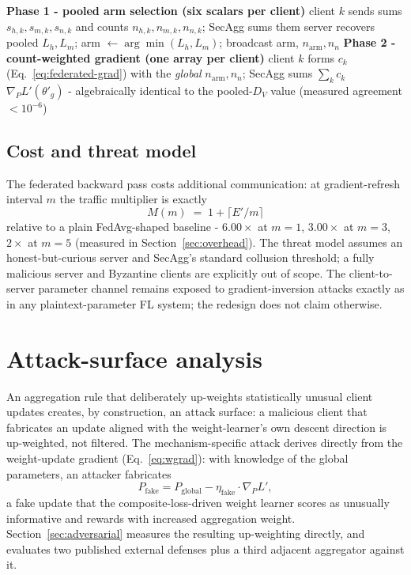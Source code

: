 \documentclass[11pt,a4paper]{report}
\newcommand{\Lprime}{L'}
\begin{document}
\begin{algorithm}[htbp]
\caption{FedGRAA-v2 federated backward pass (two-phase, count-weighted)}
\label{alg:fedgraa-v2}
\begin{algorithmic}[1]
\Statex \textbf{Phase 1 - pooled arm selection (six scalars per client)}
\State client $k$ sends sums $s_{h,k},s_{m,k},s_{n,k}$ and counts
  $n_{h,k},n_{m,k},n_{n,k}$; SecAgg sums them
\State server recovers pooled $L_h,L_m$; arm $\gets\arg\min(L_h,L_m)$;
  broadcast arm, $n_{\mathrm{arm}}, n_n$
\Statex \textbf{Phase 2 - count-weighted gradient (one array per client)}
\State client $k$ forms $c_k$ (Eq.~\eqref{eq:federated-grad}) with the
  \emph{global} $n_{\mathrm{arm}}, n_n$; SecAgg sums $\sum_k c_k$
\State \Return $\nabla_P\Lprime(\theta'_g)$ - algebraically identical to
  the pooled-$D_V$ value (measured agreement $<10^{-6}$)
\end{algorithmic}
\end{algorithm}

\subsection{Cost and threat model}
The federated backward pass costs additional communication: at
gradient-refresh interval $m$ the traffic multiplier is exactly
\begin{equation}
M(m) \;=\; 1+\lceil E'/m \rceil
\label{eq:overhead}
\end{equation}
relative to a plain FedAvg-shaped baseline - $6.00\times$ at $m=1$,
$3.00\times$ at $m=3$, $2\times$ at $m=5$ (measured in
Section~\ref{sec:overhead}). The threat model assumes an honest-but-curious
server and SecAgg's standard collusion threshold; a fully malicious server
and Byzantine clients are explicitly out of scope. The client-to-server
parameter channel remains exposed to gradient-inversion attacks
\cite{zhu2019dlg} exactly as in any plaintext-parameter FL system; the
redesign does not claim otherwise.

\section{Attack-surface analysis}
\label{sec:attack-surface}

An aggregation rule that deliberately up-weights statistically unusual client
updates creates, by construction, an attack surface: a malicious client that
fabricates an update aligned with the weight-learner's own descent direction
is up-weighted, not filtered. The mechanism-specific attack derives directly
from the weight-update gradient (Eq.~\eqref{eq:wgrad}): with knowledge of the
global parameters, an attacker fabricates
\begin{equation}
P_{\mathrm{fake}} = P_{\mathrm{global}} - \eta_{\mathrm{fake}}\cdot\nabla_P\Lprime,
\label{eq:attack}
\end{equation}
a fake update that the composite-loss-driven weight learner scores as
unusually informative and rewards with increased aggregation weight.
Section~\ref{sec:adversarial} measures the resulting up-weighting directly,
and evaluates two published external defenses plus a third adjacent
aggregator against it.
\end{document}
